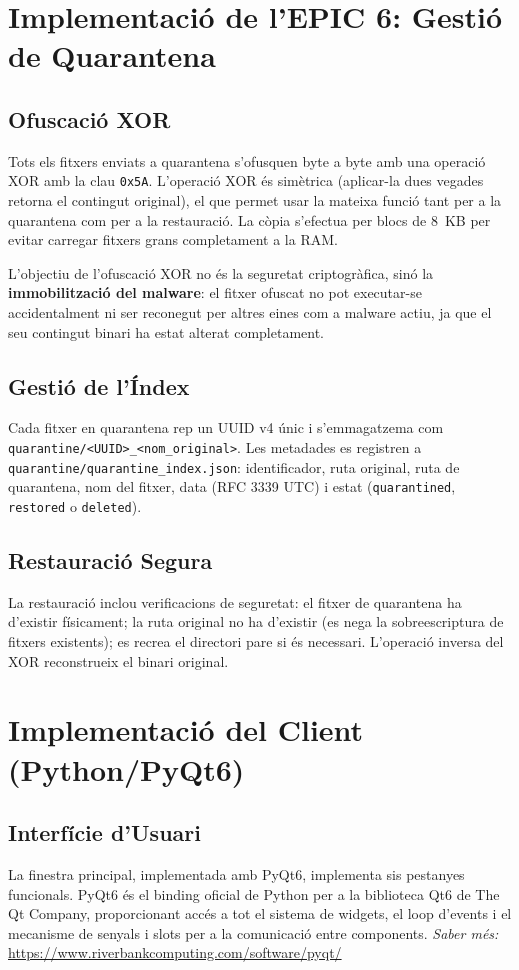 \documentclass[12pt,a4paper]{report}
\begin{document}
\section{Implementació de l'EPIC 6: Gestió de Quarantena}

\subsection{Ofuscació XOR}
Tots els fitxers enviats a quarantena s'ofusquen byte a byte amb una operació XOR amb la clau \texttt{0x5A}. L'operació XOR és simètrica (aplicar-la dues vegades retorna el contingut original), el que permet usar la mateixa funció tant per a la quarantena com per a la restauració. La còpia s'efectua per blocs de 8~KB per evitar carregar fitxers grans completament a la RAM.

L'objectiu de l'ofuscació XOR no és la seguretat criptogràfica, sinó la \textbf{immobilització del malware}: el fitxer ofuscat no pot executar-se accidentalment ni ser reconegut per altres eines com a malware actiu, ja que el seu contingut binari ha estat alterat completament.

\subsection{Gestió de l'Índex}
Cada fitxer en quarantena rep un UUID v4 únic i s'emmagatzema com \texttt{quarantine/<UUID>\_<nom\_original>}. Les metadades es registren a \texttt{quarantine/quarantine\_index.json}: identificador, ruta original, ruta de quarantena, nom del fitxer, data (RFC 3339 UTC) i estat (\texttt{quarantined}, \texttt{restored} o \texttt{deleted}).

\subsection{Restauració Segura}
La restauració inclou verificacions de seguretat: el fitxer de quarantena ha d'existir físicament; la ruta original no ha d'existir (es nega la sobreescriptura de fitxers existents); es recrea el directori pare si és necessari. L'operació inversa del XOR reconstrueix el binari original.

\section{Implementació del Client (Python/PyQt6)}

\subsection{Interfície d'Usuari}
La finestra principal, implementada amb PyQt6, implementa sis pestanyes funcionals. PyQt6 és el binding oficial de Python per a la biblioteca Qt6 de The Qt Company, proporcionant accés a tot el sistema de widgets, el loop d'events i el mecanisme de senyals i slots per a la comunicació entre components. \textit{Saber més:} \url{https://www.riverbankcomputing.com/software/pyqt/}
\end{document}
